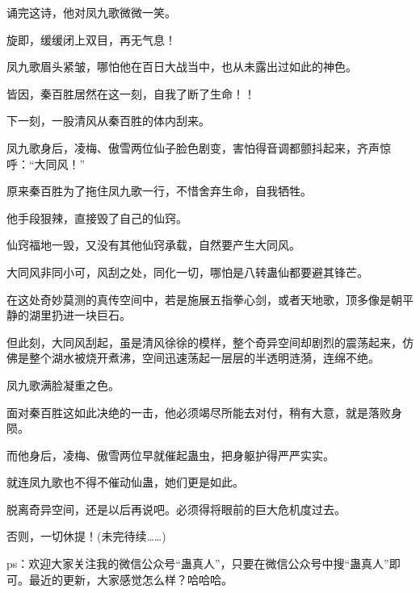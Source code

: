 \begin{this_body}
诵完这诗，他对凤九歌微微一笑。

旋即，缓缓闭上双目，再无气息！

凤九歌眉头紧皱，哪怕他在百日大战当中，也从未露出过如此的神色。

皆因，秦百胜居然在这一刻，自我了断了生命！！

下一刻，一股清风从秦百胜的体内刮来。

凤九歌身后，凌梅、傲雪两位仙子脸色剧变，害怕得音调都颤抖起来，齐声惊呼：“大同风！”

原来秦百胜为了拖住凤九歌一行，不惜舍弃生命，自我牺牲。

他手段狠辣，直接毁了自己的仙窍。

仙窍福地一毁，又没有其他仙窍承载，自然要产生大同风。

大同风非同小可，风刮之处，同化一切，哪怕是八转蛊仙都要避其锋芒。

在这处奇妙莫测的真传空间中，若是施展五指拳心剑，或者天地歌，顶多像是朝平静的湖里扔进一块巨石。

但此刻，大同风刮起，虽是清风徐徐的模样，整个奇异空间却剧烈的震荡起来，仿佛是整个湖水被烧开煮沸，空间迅速荡起一层层的半透明涟漪，连绵不绝。

凤九歌满脸凝重之色。

面对秦百胜这如此决绝的一击，他必须竭尽所能去对付，稍有大意，就是落败身陨。

而他身后，凌梅、傲雪两位早就催起蛊虫，把身躯护得严严实实。

就连凤九歌也不得不催动仙蛊，她们更是如此。

脱离奇异空间，还是以后再说吧。必须得将眼前的巨大危机度过去。

否则，一切休提！(未完待续……)

ps：欢迎大家关注我的微信公众号“蛊真人”，只要在微信公众号中搜“蛊真人”即可。最近的更新，大家感觉怎么样？哈哈哈。

\end{this_body}

